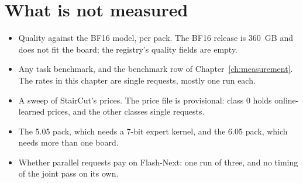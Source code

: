 \section{What is not measured}

\begin{itemize}
\item Quality against the BF16 model, per pack. The BF16 release is 360~GB and does not fit the board; the registry's quality fields are empty.
\item Any task benchmark, and the benchmark row of Chapter~\ref{ch:measurement}. The rates in this chapter are single requests, mostly one run each.
\item A sweep of StairCut's prices. The price file is provisional: class 0 holds online-learned prices, and the other classes single requests.
\item The 5.05 pack, which needs a 7-bit expert kernel, and the 6.05 pack, which needs more than one board.
\item Whether parallel requests pay on Flash-Next: one run of three, and no timing of the joint pass on its own.
\end{itemize}
